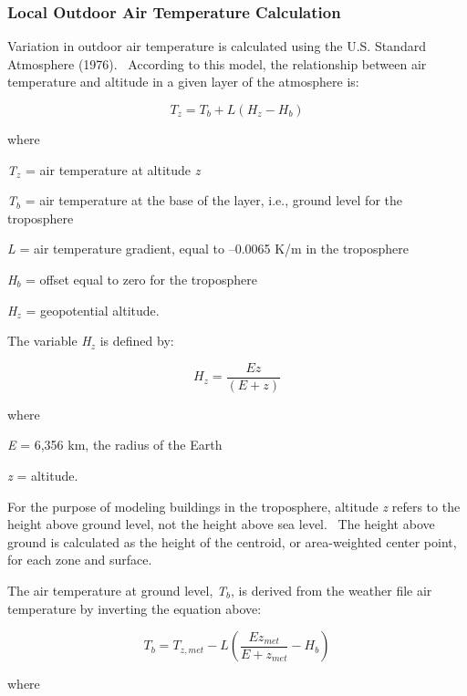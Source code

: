 \subsubsection{Local Outdoor Air Temperature Calculation}\label{local-outdoor-air-temperature-calculation}

Variation in outdoor air temperature is calculated using the U.S. Standard Atmosphere (1976).~ According to this model, the relationship between air temperature and altitude in a given layer of the atmosphere is:

\begin{equation}
{T_z} = {T_b} + L\left( {{H_z} - {H_b}} \right)
\end{equation}

where

\emph{T\(_{z}\)} = air temperature at altitude \emph{z}

\emph{T\(_{b}\)} = air temperature at the base of the layer, i.e., ground level for the troposphere

\emph{L} = air temperature gradient, equal to --0.0065 K/m in the troposphere

\emph{H\(_{b}\)} = offset equal to zero for the troposphere

\emph{H\(_{z}\)} = geopotential altitude.

The variable \emph{H\(_{z}\)} is defined by:

\begin{equation}
{H_z} = \frac{{Ez}}{{\left( {E + z} \right)}}
\end{equation}

where

\emph{E} = 6,356 km, the radius of the Earth

\emph{z} = altitude.

For the purpose of modeling buildings in the troposphere, altitude \emph{z} refers to the height above ground level, not the height above sea level.~ The height above ground is calculated as the height of the centroid, or area-weighted center point, for each zone and surface.

The air temperature at ground level, \emph{T\(_{b}\)}, is derived from the weather file air temperature by inverting the equation above:

\begin{equation}
{T_b} = {T_{z,met}} - L\left( {\frac{{E{z_{met}}}}{{E + {z_{met}}}} - {H_b}} \right)
\end{equation}

where

